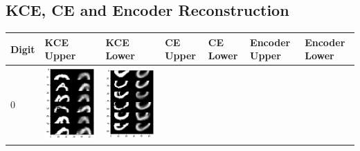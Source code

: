 \documentclass[12pt]{report} %
\begin{document}
\subsection{KCE, CE and Encoder Reconstruction}
\begin{tabular}{m{0.7cm}m{2.4cm}m{2.4cm}m{2.4cm}m{2.4cm}m{2.4cm}m{2.4cm}}
\toprule
Digit & KCE Upper & KCE Lower & CE Upper & CE Lower & Encoder Upper & Encoder Lower\\
\midrule
0 & \includegraphics[scale=0.3]{pictures/KE_0_up.png} & \includegraphics[scale=0.3]{pictures/KE_0_down.png} &

\end{tabular}
\end{document}
